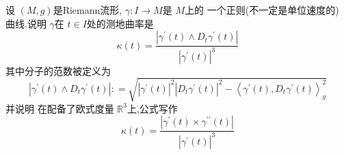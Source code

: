 \documentclass[../../几何与拓扑.tex]{subfiles}
\begin{document}
\begin{problem}
    设 \(  \left( M,g \right)   \)是Riemann流形, \(   \gamma :I\to M  \)是 \(  M  \)上的 一个正则(不一定是单位速度的)  曲线.说明 \(   \gamma   \)在 \(  t \in I  \)处的测地曲率是 \[
     \kappa \left( t \right)= \frac{\left|  \gamma ^{\prime} \left( t \right)\wedge D_{t} \gamma ^{\prime} \left( t \right)   \right|  }{\left|  \gamma ^{\prime} \left( t \right)  \right|^{3}  }  
    \]其中分子的范数被定义为 \[
    \left|  \gamma ^{\prime} \left( t \right)\wedge D_{t} \gamma ^{\prime} \left( t \right)   \right|: =  \sqrt{\left|  \gamma ^{\prime} \left( t \right)  \right|^{2}\left| D_{t} \gamma ^{\prime} \left( t \right)  \right|^{2}- \left< \gamma ^{\prime} \left( t \right),D_{t} \gamma ^{\prime} \left( t \right)   \right>_{g}^{2} } 
    \]  并说明 在配备了欧式度量 \(  \mathbb{R} ^{3}  \)上,公式写作 \[
     \kappa \left( t \right)= \frac{\left|  \gamma ^{\prime} \left( t \right)\times  \gamma ^{\prime \prime} \left( t \right)   \right|  }{\left|  \gamma ^{\prime} \left( t \right)  \right|^{3}  }  
    \] 
\end{problem}
\end{document}
